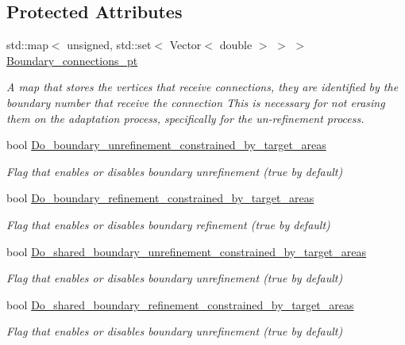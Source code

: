 \subsection*{Protected Attributes}
\begin{DoxyCompactItemize}
\item 
std\+::map$<$ unsigned, std\+::set$<$ Vector$<$ double $>$ $>$ $>$ \hyperlink{classoomph_1_1RefineableTriangleMesh_a099ddd14a05c116188ecc3d6ec2f68d1}{Boundary\+\_\+connections\+\_\+pt}
\begin{DoxyCompactList}\small\item\em A map that stores the vertices that receive connections, they are identified by the boundary number that receive the connection This is necessary for not erasing them on the adaptation process, specifically for the un-\/refinement process. \end{DoxyCompactList}\item 
bool \hyperlink{classoomph_1_1RefineableTriangleMesh_a859abc98c895069efdd3af5c578e993e}{Do\+\_\+boundary\+\_\+unrefinement\+\_\+constrained\+\_\+by\+\_\+target\+\_\+areas}
\begin{DoxyCompactList}\small\item\em Flag that enables or disables boundary unrefinement (true by default) \end{DoxyCompactList}\item 
bool \hyperlink{classoomph_1_1RefineableTriangleMesh_aae4994b1d7eaf5f408dffa1376c1a743}{Do\+\_\+boundary\+\_\+refinement\+\_\+constrained\+\_\+by\+\_\+target\+\_\+areas}
\begin{DoxyCompactList}\small\item\em Flag that enables or disables boundary refinement (true by default) \end{DoxyCompactList}\item 
bool \hyperlink{classoomph_1_1RefineableTriangleMesh_a33354e28a1dc5f457f7e22ae19c1db4f}{Do\+\_\+shared\+\_\+boundary\+\_\+unrefinement\+\_\+constrained\+\_\+by\+\_\+target\+\_\+areas}
\begin{DoxyCompactList}\small\item\em Flag that enables or disables boundary unrefinement (true by default) \end{DoxyCompactList}\item 
bool \hyperlink{classoomph_1_1RefineableTriangleMesh_ab6a6a7aa732c31a8895ad502466ab242}{Do\+\_\+shared\+\_\+boundary\+\_\+refinement\+\_\+constrained\+\_\+by\+\_\+target\+\_\+areas}
\begin{DoxyCompactList}\small\item\em Flag that enables or disables boundary unrefinement (true by default) \end{DoxyCompactList}\item 

\end{DoxyCompactItemize}
